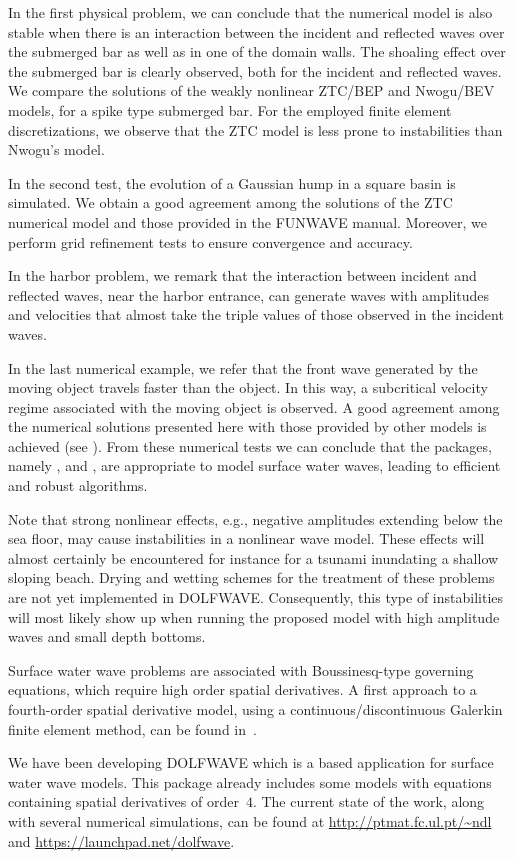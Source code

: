 In the first physical problem, we can conclude that the numerical
model is also stable when there is an interaction between the incident
and reflected waves over the submerged bar as well as in one of the
domain walls. The shoaling effect over the submerged bar is clearly
observed, both for the incident and reflected waves.  We compare the
solutions of the weakly nonlinear ZTC/BEP and Nwogu/BEV models, for a
spike type submerged bar.  For the employed finite element
discretizations, we observe that the ZTC model is less prone to
instabilities than Nwogu's model.

In the second test, the evolution of a Gaussian hump in a square basin
is simulated.  We obtain a good agreement among the solutions of the
ZTC numerical model and those provided in the FUNWAVE manual.
Moreover, we perform grid refinement tests to ensure convergence and
accuracy.

In the harbor problem, we remark that the interaction between incident
and reflected waves, near the harbor entrance, can generate waves with
amplitudes and velocities that almost take the triple values of those
observed in the incident waves.

In the last numerical example, we refer that the front wave generated
by the moving object travels faster than the object.  In this way, a
subcritical velocity regime associated with the moving object is
observed.  A good agreement among the numerical solutions presented
here with those provided by other models is achieved (see
).  From these numerical tests we can conclude that
the \fenics packages, namely \dolfin, \ufl and \ffc, are appropriate
to model surface water waves, leading to efficient and robust
algorithms.

Note that strong nonlinear effects, e.g., negative amplitudes
extending below the sea floor, may cause instabilities in a nonlinear
wave model.  These effects will almost certainly be encountered for
instance for a tsunami inundating a shallow sloping beach.  Drying and
wetting schemes for the treatment of these problems are not yet
implemented in DOLFWAVE.  Consequently, this type of instabilities
will most likely show up when running the proposed model with high
amplitude waves and small depth bottoms.

Surface water wave problems are associated with Boussinesq-type
governing equations, which require high order spatial derivatives. A
first approach to a fourth-order spatial derivative model, using a
continuous/discontinuous Galerkin finite element method, can be found
in~\citet{LopesPereiraTrabucho}.

We have been developing DOLFWAVE which is a \fenics based application
for surface water wave models. This package already includes some
models with equations containing spatial derivatives of order~$4$.
The current state of the work, along with several numerical
simulations, can be found at \url{http://ptmat.fc.ul.pt/~ndl} and
\url{https://launchpad.net/dolfwave}.
